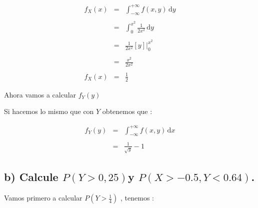 \documentclass[12pt]{article}
\begin{document}
    \begin{equation*}
        \begin{array}{rcl}
            \displaystyle f_{X}\left(x\right) & = & \displaystyle \int_{-\infty}^{+ \infty} f \left(x,y\right) \,\mathrm{d}y
            \\
            \\
            & =  & \displaystyle \int_{0}^{x^2} \frac{1}{2x^2} \,\mathrm{d}y   
            \\
            \\
            & = & \displaystyle \frac{1}{2x^2} \left[y\right] \vert_{0}^{x^2}
            \\
            \\
            & = & \displaystyle \frac{x^2}{2x^2}
            \\
            \\
            \displaystyle f_{X}\left(x\right) & = & \frac{1}{2} 
        \end{array}
    \end{equation*}

    \begin{flushleft}
        Ahora vamos a calcular $f_{Y} \left(y\right)$
    \end{flushleft}

    

    \begin{flushleft}
        Si hacemos lo mismo que  con $Y$ obtenemos que : 
    \end{flushleft}
         
    \begin{equation*}
        \begin{array}{rcl}
            f_Y\left(y\right) & = & \displaystyle \int_{- \infty}^{+ \infty} f \left(x,y \right) \,\mathrm{d}x 
            \\
            \\
            & = & \displaystyle  \frac{1}{\sqrt{y}} -1 
        \end{array}
    \end{equation*}


    \subsection*{b) Calcule  $P\left(Y > 0,25 \right) $y $P \left(X > −0.5, Y < 0.64\right)$.}
    
    \vspace{0.5cm}
    \begin{flushleft}
        Vamos primero a calcular $P \left(Y > \frac{1}{4}\right)$ , tenemos : 
    \end{flushleft}
\end{document}
